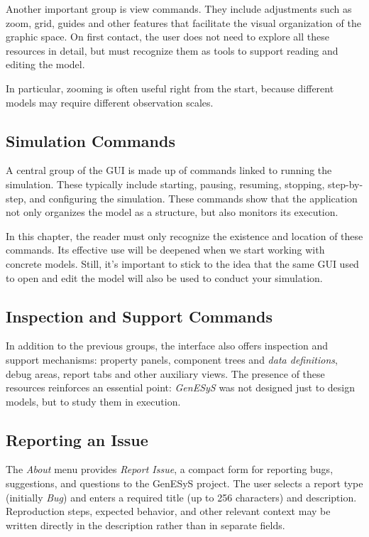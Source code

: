 Another important group is view commands. They include adjustments such as zoom, grid, guides and other features that facilitate the visual organization of the graphic space. On first contact, the user does not need to explore all these resources in detail, but must recognize them as tools to support reading and editing the model.

In particular, zooming is often useful right from the start, because different models may require different observation scales.

\subsection{Simulation Commands}
\label{subsec:cap3_comandos_simulacao}

A central group of the GUI is made up of commands linked to running the simulation. These typically include starting, pausing, resuming, stopping, step-by-step, and configuring the simulation. These commands show that the application not only organizes the model as a structure, but also monitors its execution.

In this chapter, the reader must only recognize the existence and location of these commands. Its effective use will be deepened when we start working with concrete models. Still, it's important to stick to the idea that the same GUI used to open and edit the model will also be used to conduct your simulation.

\subsection{Inspection and Support Commands}
\label{subsec:cap3_comandos_inspecao_apoio}

In addition to the previous groups, the interface also offers inspection and support mechanisms: property panels, component trees and \textit{data definitions}, debug areas, report tabs and other auxiliary views. The presence of these resources reinforces an essential point: \textit{GenESyS} was not designed just to design models, but to study them in execution.

\subsection{Reporting an Issue}
\label{subsec:cap3_report_issue}

The \textit{About} menu provides \textit{Report Issue}, a compact form for
reporting bugs, suggestions, and questions to the GenESyS project. The user
selects a report type (initially \textit{Bug}) and enters a required title
(up to 256 characters) and description. Reproduction steps, expected behavior,
and other relevant context may be written directly in the description rather
than in separate fields.

